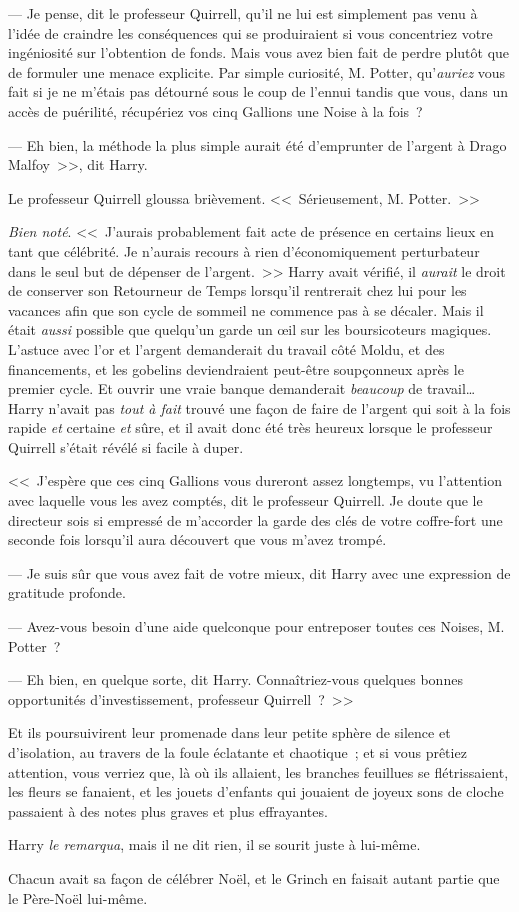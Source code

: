 --- Je pense, dit le professeur Quirrell, qu'il ne lui est simplement pas venu à l'idée de craindre les conséquences qui se produiraient si vous concentriez votre ingéniosité sur l'obtention de fonds. Mais vous avez bien fait de perdre plutôt que de formuler une menace explicite. Par simple curiosité, M. Potter, qu'\emph{auriez} vous fait si je ne m'étais pas détourné sous le coup de l'ennui tandis que vous, dans un accès de puérilité, récupériez vos cinq Gallions une Noise à la fois~?

--- Eh bien, la méthode la plus simple aurait été d'emprunter de l'argent à Drago Malfoy~>>, dit Harry.

Le professeur Quirrell gloussa brièvement. <<~Sérieusement, M. Potter.~>>

\emph{Bien noté}. <<~J'aurais probablement fait acte de présence en certains lieux en tant que célébrité. Je n'aurais recours à rien d'économiquement perturbateur dans le seul but de dépenser de l'argent.~>> Harry avait vérifié, il \emph{aurait} le droit de conserver son Retourneur de Temps lorsqu'il rentrerait chez lui pour les vacances afin que son cycle de sommeil ne commence pas à se décaler. Mais il était \emph{aussi} possible que quelqu'un garde un œil sur les boursicoteurs magiques. L'astuce avec l'or et l'argent demanderait du travail côté Moldu, et des financements, et les gobelins deviendraient peut-être soupçonneux après le premier cycle. Et ouvrir une vraie banque demanderait \emph{beaucoup} de travail… Harry n'avait pas \emph{tout à fait} trouvé une façon de faire de l'argent qui soit à la fois rapide \emph{et} certaine \emph{et} sûre, et il avait donc été très heureux lorsque le professeur Quirrell s'était révélé si facile à duper.

<<~J'espère que ces cinq Gallions vous dureront assez longtemps, vu l'attention avec laquelle vous les avez comptés, dit le professeur Quirrell. Je doute que le directeur sois si empressé de m'accorder la garde des clés de votre coffre-fort une seconde fois lorsqu'il aura découvert que vous m'avez trompé.

--- Je suis sûr que vous avez fait de votre mieux, dit Harry avec une expression de gratitude profonde.

--- Avez-vous besoin d'une aide quelconque pour entreposer toutes ces Noises, M. Potter~?

--- Eh bien, en quelque sorte, dit Harry. Connaîtriez-vous quelques bonnes opportunités d'investissement, professeur Quirrell~?~>>

Et ils poursuivirent leur promenade dans leur petite sphère de silence et d'isolation, au travers de la foule éclatante et chaotique~; et si vous prêtiez attention, vous verriez que, là où ils allaient, les branches feuillues se flétrissaient, les fleurs se fanaient, et les jouets d'enfants qui jouaient de joyeux sons de cloche passaient à des notes plus graves et plus effrayantes.

Harry \emph{le remarqua}, mais il ne dit rien, il se sourit juste à lui-même.

Chacun avait sa façon de célébrer Noël, et le Grinch en faisait autant partie que le Père-Noël lui-même.
